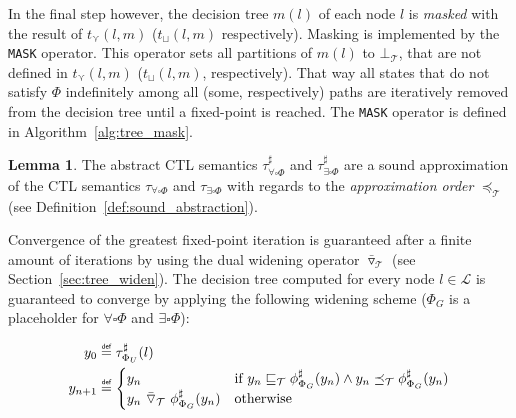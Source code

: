 \documentclass[11pt,a4paper,titlepage]{article}
\theoremstyle{definition}
\newtheorem{lemma}[theorem]{Lemma}
\newcommand\eqdef{\mathrel{\overset{\makebox[0pt]{\mbox{\normalfont\tiny\sffamily def}}}{=}}}
\begin{document}
In the final step however, the decision tree $m(l)$ of each node $l$ is \textit{masked} with the result of $t_{\curlyvee}(l,m)$ ($t_{\sqcup}(l,m)$ respectively).
Masking is implemented by the \texttt{MASK} operator. This operator sets all partitions of $m(l)$ to $\bot_\mathcal{T}$,
that are not defined in $t_{\curlyvee}(l,m)$ ($t_{\sqcup}(l,m)$, respectively).
That way all states that do not satisfy $\Phi$ indefinitely among all (some, respectively) paths are iteratively 
removed from the decision tree until a fixed-point is reached. 
The \texttt{MASK} operator is defined in Algorithm~\ref{alg:tree_mask}.


\begin{lemma}
    The abstract CTL semantics 
    $\tau^{\sharp}_{\forall\square\Phi}$ and $\tau^{\sharp}_{\exists\square\Phi}$
    are a sound approximation of the CTL semantics
    $\tau_{\forall\square\Phi}$ and $\tau_{\exists\square\Phi}$
    with regards to the \textit{approximation order} $\preceq_\mathcal{T}$ (see Definition~\ref{def:sound_abstraction}).\\
\end{lemma}

Convergence of the greatest fixed-point iteration is guaranteed after a finite amount of iterations by using the dual 
widening operator $\bar\triangledown_\mathcal{T}$  (see Section~\ref{sec:tree_widen}). 
The decision tree computed for every node $l \in \mathcal{L}$ is guaranteed to converge by applying the following widening scheme 
($\Phi_G$ is a placeholder for $\forall\square\Phi$ and $\exists\square\Phi$):

\begin{align*}
    y_0 &\eqdef \tau^\sharp_{\Phi_U}(l)\\
    y_{n+1} &\eqdef 
    \begin{cases}
        y_n                   &\text{if} \ y_n \sqsubseteq_\mathcal{T} \phi^\sharp_{\Phi_{G}}(y_n)  
        \land y_n \preceq_\mathcal{T} \phi^\sharp_{\Phi_G}(y_n)  \\
        y_n \ \bar\triangledown_\mathcal{T} \ \phi^\sharp_{\Phi_G}(y_n)     &\text{otherwise}
    \end{cases}
\end{align*}
\end{document}
